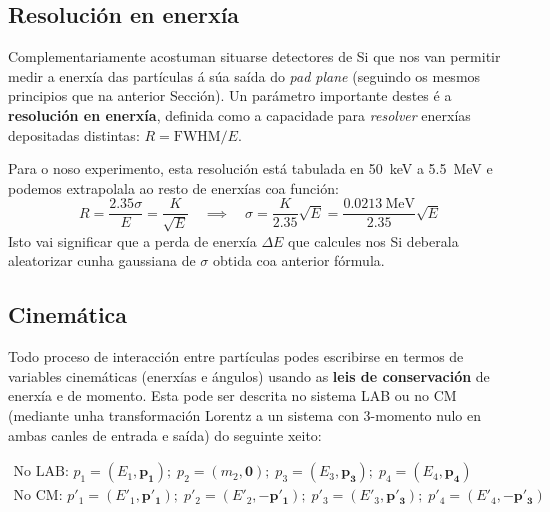 \documentclass[11pt, a4paper]{article}
\newcommand{\vect}[1]{\boldsymbol{#1}}
\begin{document}
\subsection{Resolución en enerxía}\label{sec:res}
Complementariamente acostuman situarse detectores de Si que nos van permitir medir a enerxía das partículas á súa saída do \textit{pad plane} (seguindo os mesmos principios que na anterior Sección). Un parámetro importante destes é a \textbf{resolución en enerxía}, definida como a capacidade para \textit{resolver} enerxías depositadas distintas: $R = \textrm{FWHM} / E$.

Para o noso experimento, esta resolución está tabulada en \qty{50}{\keV} a \qty{5.5}{\MeV} e podemos extrapolala ao resto de enerxías coa función:
\begin{equation*}
    R = \frac{2.35 \sigma}{E} = \frac{K}{\sqrt{E}} \quad \implies \quad \sigma = \frac{K}{2.35}\sqrt{E} = \frac{\qty{0.0213}{\MeV}}{2.35} \sqrt{E}
\end{equation*}
Isto vai significar que a perda de enerxía $\Delta E$ que calcules nos Si deberala aleatorizar cunha gaussiana de $\sigma$ obtida coa anterior fórmula.

\subsection{Cinemática}
Todo proceso de interacción entre partículas podes escribirse en termos de variables cinemáticas (enerxías e ángulos) usando as \textbf{leis de conservación} de enerxía e de momento. Esta pode ser descrita no sistema LAB ou no CM (mediante unha transformación Lorentz a un sistema con 3-momento nulo en ambas canles de entrada e saída) do seguinte xeito:

\begin{equation*}
    \begin{gathered}
        \text{No LAB:  }p_1=\left(E_1, \vect{p_1}\right); \; p_2=\left(m_2, \vect{0}\right); \; p_3=\left(E_3, \vect{p_3}\right); \; p_4=\left(E_4, \vect{p_4}\right) \\
        \text{No CM:  }p'_1=\left(E'_1, \vect{p'_1}\right); \;  p'_2=\left(E'_2, -\vect{p'_1}\right); \; p'_3=\left(E'_3, \vect{p'_3}\right); \; p'_4=\left(E'_4, -\vect{p'_3}\right)
    \end{gathered}
\end{equation*}
\end{document}
